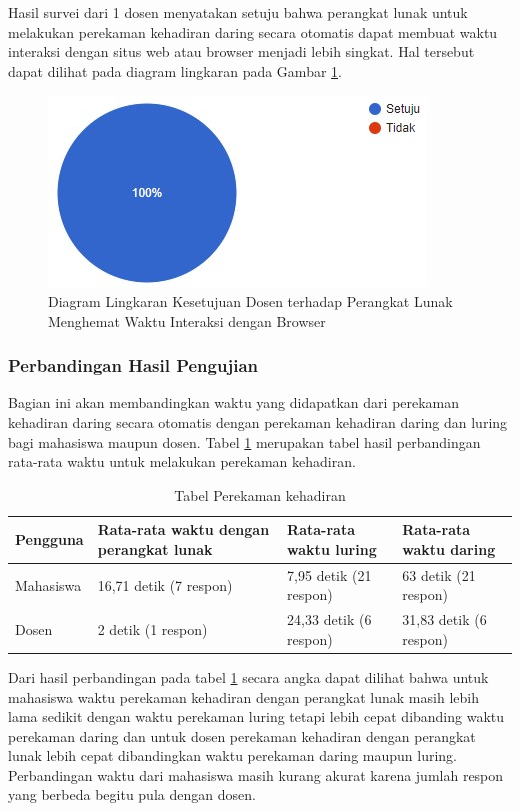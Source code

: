 Hasil survei dari 1 dosen menyatakan setuju bahwa perangkat lunak untuk melakukan perekaman kehadiran daring secara otomatis dapat membuat waktu interaksi dengan situs web atau browser menjadi lebih singkat. Hal tersebut dapat dilihat pada diagram lingkaran pada Gambar \ref{fig:interaksiDosen}.
\begin{figure}[H]
	\centering
	\includegraphics[scale=0.7]{Gambar/diagramLingkaran.jpg}
	\caption{Diagram Lingkaran Kesetujuan Dosen terhadap Perangkat Lunak Menghemat Waktu Interaksi dengan Browser} 
	\label{fig:interaksiDosen}
\end{figure}

\subsubsection{Perbandingan Hasil Pengujian}
Bagian ini akan membandingkan waktu yang didapatkan dari perekaman kehadiran daring secara otomatis dengan perekaman kehadiran daring dan luring bagi mahasiswa maupun dosen. Tabel \ref{tab:banding} merupakan tabel hasil perbandingan rata-rata waktu untuk melakukan perekaman kehadiran.
\begin{table}[H]			
 	\caption{Tabel Perekaman kehadiran}
 	\centering
 	\begin{tabular}{|p{2cm} |p{4cm} |p{4cm}| p{4cm}|} \hline
 		Pengguna & Rata-rata waktu dengan perangkat lunak & Rata-rata waktu luring & Rata-rata waktu daring\\ \hline     
 		Mahasiswa & 16,71 detik (7 respon)& 7,95 detik (21 respon)& 63 detik (21 respon)\\ \hline 
 		Dosen & 2 detik (1 respon)&  24,33 detik (6 respon)& 31,83 detik (6 respon)\\ \hline 
 	\end{tabular}
 	\label{tab:banding} 
\end{table}
Dari hasil perbandingan pada tabel \ref{tab:banding} secara angka dapat dilihat bahwa untuk mahasiswa waktu perekaman kehadiran dengan perangkat lunak masih lebih lama sedikit dengan waktu perekaman luring tetapi lebih cepat dibanding waktu perekaman daring dan untuk dosen perekaman kehadiran dengan perangkat lunak lebih cepat dibandingkan waktu perekaman daring maupun luring. Perbandingan waktu dari mahasiswa masih kurang akurat karena jumlah respon yang berbeda begitu pula dengan dosen.